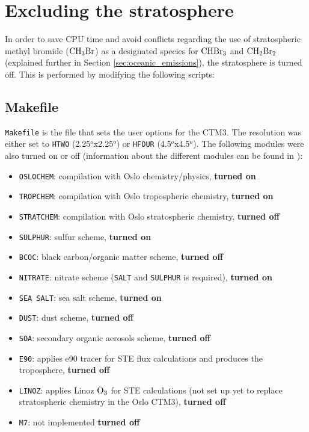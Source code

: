 \section{Excluding the stratosphere}\label{subsec:strat}

In order to save CPU time and avoid conflicts regarding the use of stratospheric methyl bromide ($\mathrm{CH_3Br}$) as a designated species for $\mathrm{CHBr_3}$ and $\mathrm{CH_2Br_2}$ (explained further in Section \ref{sec:oceanic_emissions}), the stratosphere is turned off. This is performed by modifying the following scripts: 

\subsection{Makefile}\label{subsubsec:makefile}

\texttt{Makefile} is the file that sets the user options for the CTM3. The resolution was either set to \texttt{HTWO} (2.25$^o$x2.25$^o$) or \texttt{HFOUR} (4.5$^o$x4.5$^o$). The following modules were also turned on or off (information about the different modules can be found in \cite{SovdeManual}):

\begin{itemize}
    \item \texttt{OSLOCHEM}: compilation with Oslo chemistry/physics, \textbf{turned on}
    \item \texttt{TROPCHEM}: compilation with Oslo tropospheric chemistry, \textbf{turned on}
    \item \texttt{STRATCHEM}: compilation with Oslo stratospheric chemistry, \textbf{turned off}
    \item \texttt{SULPHUR}: sulfur scheme, \textbf{turned on}
    \item \texttt{BCOC}: black carbon/organic matter scheme, \textbf{turned off}
    \item \texttt{NITRATE}: nitrate scheme (\texttt{SALT} and \texttt{SULPHUR} is required), \textbf{turned on}
    \item \texttt{SEA SALT}: sea salt scheme, \textbf{turned on}
    \item \texttt{DUST}: dust scheme, \textbf{turned off}
    \item \texttt{SOA}: secondary organic aerosols scheme, \textbf{turned off}
    \item \texttt{E90}: applies e90 tracer for STE flux calculations and produces the troposphere, \textbf{turned off}
    \item \texttt{LINOZ}: applies Linoz $\mathrm{O_3}$ for STE calculations (not set up yet to replace stratospheric chemistry in the Oslo CTM3), \textbf{turned off}
    \item \texttt{M7}: not implemented \textbf{turned off}
\end{itemize}


